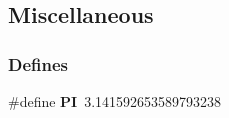 \hypertarget{group__miscellaneous}{
\subsection{Miscellaneous}
\label{group__miscellaneous}
}
\subsubsection*{Defines}
\begin{DoxyCompactItemize}
\item 
\hypertarget{group__miscellaneous_ga598a3330b3c21701223ee0ca14316eca}{
\#define {\bfseries PI}~3.141592653589793238}
\label{group__miscellaneous_ga598a3330b3c21701223ee0ca14316eca}

\end{DoxyCompactItemize}
